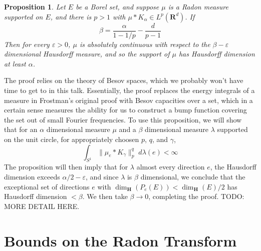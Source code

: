 \documentclass{article}
\theoremstyle{plain}
\newtheorem{prop}[theorem]{Proposition}
\theoremstyle{remark}
\theoremstyle{definition}
\begin{document}
\begin{prop}
	Let $E$ be a Borel set, and suppose $\mu$ is a Radon measure supported on $E$, and there is $p > 1$ with $\mu * K_\alpha \in L^p(\mathbf{R}^d)$. If
	\[ \beta = \frac{\alpha}{1 - 1/p} - \frac{d}{p-1} \]
	Then for every $\varepsilon > 0$, $\mu$ is absolutely continuous with respect to the $\beta - \varepsilon$ dimensional Hausdorff measure, and so the support of $\mu$ has Hausdorff dimension at least $\alpha$.
\end{prop}

The proof relies on the theory of Besov spaces, which we probably won't have time to get to in this talk. Essentially, the proof replaces the energy integrals of a measure in Frostman's original proof with Besov capacities over a set, which in a certain sense measures the ability for us to construct a bump function covering the set out of small Fourier frequencies. To use this proposition, we will show that for an $\alpha$ dimensional measure $\mu$ and a $\beta$ dimensional measure $\lambda$ supported on the unit circle, for appropriately choosen $p$, $q$, and $\gamma$,
%
\[ \int_{S^1} \| \mu_e * K_\gamma \|_p^q\; d\lambda(e) < \infty \]
%
The proposition will then imply that for $\lambda$ almost every direction $e$, the Hausdorff dimension exceeds $\alpha/2 - \varepsilon$, and since $\lambda$ is $\beta$ dimensional, we conclude that the exceptional set of directions $e$ with $\dim_{\mathbf{H}}(P_e(E)) < \dim_{\mathbf{H}}(E)/2$ has Hausdorff dimension $< \beta$. We then take $\beta \to 0$, completing the proof. TODO: MORE DETAIL HERE.

\section{Bounds on the Radon Transform}
\end{document}
